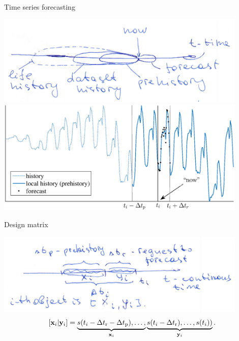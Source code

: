 \documentclass{beamer}
\begin{document}
\begin{frame}{Time series forecasting}

\includegraphics[width=0.9\textwidth]{online_forecasting_paradigm.png} \\


\includegraphics[width=0.9\textwidth]{history_prehistory_frc.eps}


\end{frame}
\begin{frame}{Design matrix}

\includegraphics[width=0.9\textwidth]{draw_object.png} \\

\[
[{\mathbf{x}}_i | {\mathbf{y}}_i] = \underbrace{s(t_i-\Delta t_\text{r}-\Delta t_\text{p}),\dots,}_{{\mathbf{x}}_i} \underbrace{s(t_i-\Delta t_\text{r}),\dots,s(t_i))}_{{\mathbf{y}}_i}. \]

\end{frame}
\end{document}
